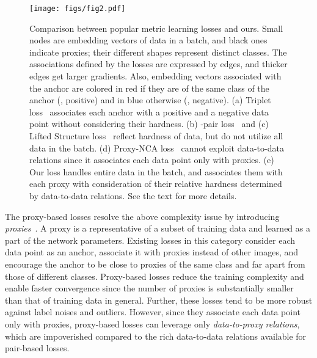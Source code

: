 \documentclass[10pt,twocolumn,letterpaper]{article}
\begin{document}
\begin{figure*} [!t]
\centering
\texttt{[image: figs/fig2.pdf]}
\caption{
Comparison between popular metric learning losses and ours.
Small nodes are embedding vectors of data in a batch, and 
black ones indicate proxies; their different shapes represent distinct classes.
The associations defined by the losses are expressed by edges, and thicker edges get larger gradients.
Also, embedding vectors associated with the anchor are colored in red if they are of the same class of the anchor (\ie, positive) and in blue otherwise (\ie, negative). 
(a) Triplet loss~\cite{Wang2014, Schroff2015} associates each anchor with a positive and a negative data point without considering their hardness.
(b) -pair loss~\cite{Sohn_nips2016} and (c) Lifted Structure loss~\cite{songCVPR16} reflect hardness of data, but do not utilize all data in the batch.
(d) Proxy-NCA loss~\cite{movshovitz2017no} cannot exploit data-to-data relations since it associates 
each data point only with proxies. 
(e) Our loss handles entire data in the batch, and associates them with each proxy with consideration of their relative hardness determined by data-to-data relations. 
See the text for more details.
} 
\vspace{-2mm}
\label{fig:comparison}
\end{figure*}








The proxy-based losses resolve the above complexity issue by introducing \emph{proxies}~\cite{movshovitz2017no,aziere2019ensemble,Qian_2019_ICCV}.
A proxy is a representative of a subset of training data and learned as a part of the network parameters. 
Existing losses in this category consider each data point as an anchor, associate it with proxies instead of other images, and encourage the anchor to be close to proxies of the same class and far apart from those of different classes. 
Proxy-based losses reduce the training complexity and enable faster convergence since the number of proxies is substantially smaller than that of training data in general.
Further, these losses tend to be more robust against label noises and outliers.
However, since they associate each data point only with proxies, proxy-based losses can leverage only \emph{data-to-proxy relations}, which are impoverished compared to the rich data-to-data relations available for pair-based losses.
\end{document}

